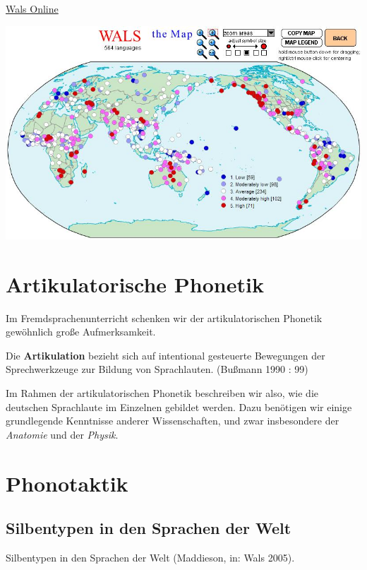 \documentclass[
  letterpaper,
]{scrbook}
\begin{document}
\href{https://wals.info/}{Wals Online}

\includegraphics[width=1\textwidth,height=\textheight]{./pictures/01b_NSG_Intro_2020-10-07/wals_vowel_consonant_ratio.png}

\hypertarget{sec-artikulation}{%
\chapter{Artikulatorische Phonetik}\label{sec-artikulation}}

Im Fremdsprachenunterricht schenken wir der artikulatorischen Phonetik
gewöhnlich große Aufmerksamkeit.

Die \textbf{Artikulation} bezieht sich auf intentional gesteuerte
Bewegungen der Sprechwerkzeuge zur Bildung von Sprachlauten. (Bußmann
1990 : 99)

Im Rahmen der artikulatorischen Phonetik beschreiben wir also, wie die
deutschen Sprachlaute im Einzelnen gebildet werden. Dazu benötigen wir
einige grundlegende Kenntnisse anderer Wissenschaften, und zwar
insbesondere der \emph{Anatomie} und der \emph{Physik}.

\hypertarget{sec-phonotaktik}{%
\chapter{Phonotaktik}\label{sec-phonotaktik}}

\hypertarget{silbentypen-in-den-sprachen-der-welt}{%
\section{Silbentypen in den Sprachen der
Welt}\label{silbentypen-in-den-sprachen-der-welt}}

Silbentypen in den Sprachen der Welt (Maddieson, in: Wals 2005).
\end{document}
